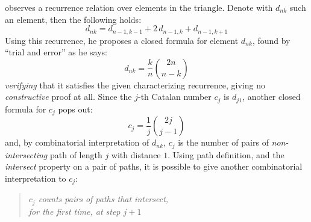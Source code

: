 \citeauthor{shapiro:1976} observes a recurrence relation over elements in the triangle.
Denote with $d_{nk}$ such an element, then the following holds:
\begin{displaymath}
    d_{nk}=d_{n-1,k-1}+2\,d_{n-1,k}+d_{n-1,k+1}
\end{displaymath}
Using this recurrence, he proposes a closed formula for element $d_{nk}$, found by 
``trial and error'' as he says:
\begin{displaymath}
    d_{nk}=\frac{k}{n}{{2n}\choose{n-k}}
\end{displaymath}
\emph{verifying} that it satisfies the given characterizing recurrence, giving
no \emph{constructive} proof at all. Since the $j$-th Catalan number $c_{j}$ is $d_{j1}$,
another closed formula for $c_{j}$ pops out:
\begin{displaymath}
    c_{j}=\frac{1}{j}{{2j}\choose{j-1}}
\end{displaymath}
and, by combinatorial interpretation of $d_{nk}$, $c_j$ is the number of pairs
of \emph{non-intersecting} path of length $j$ with distance $1$. Using path definition,
and the \emph{intersect} property on a pair of paths, it is possible to give another
combinatorial interpretation to $c_{j}$:
\begin{quote}
    \emph{$c_j$ counts pairs of paths that intersect, \\
    \indent for the first time, at step $j+1$ }
\end{quote}
